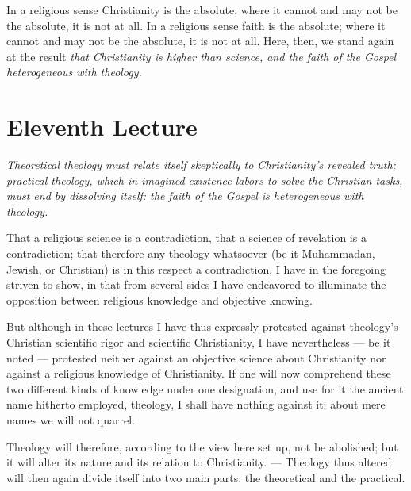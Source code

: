 \documentclass[12pt,a4paper]{book}
\begin{document}
In a religious sense Christianity is the absolute; where it cannot and may not be the absolute, it is
not at all. In a religious sense faith is the absolute; where it cannot and may not be the absolute,
it is not at all. Here, then, we stand again at the result
\emph{that Christianity is higher than science, and the faith of the Gospel heterogeneous with
theology.}

\chapter*{Eleventh Lecture}
\label{ch:forel11}

\begin{center}\itshape
Theoretical theology must relate itself skeptically to Christianity's
revealed truth; practical theology, which in imagined existence labors to
solve the Christian tasks, must end by dissolving itself: the faith of the
Gospel is heterogeneous with theology.
\end{center}

That a religious science is a contradiction, that a science of revelation is a contradiction; that
therefore any theology whatsoever (be it Muhammadan, Jewish, or Christian) is in this respect a
contradiction, I have in the foregoing striven to show, in that from several sides I have endeavored
to illuminate the opposition between religious knowledge and objective knowing.

But although in these lectures I have thus expressly protested against theology's Christian
scientific rigor and scientific Christianity, I have nevertheless --- be it noted --- protested
neither against an objective science about Christianity nor against a religious knowledge of
Christianity. If one will now comprehend these two different kinds of knowledge under one
designation, and use for it the ancient name hitherto employed, theology, I shall have nothing
against it: about mere names we will not quarrel.

Theology will therefore, according to the view here set up, not be abolished; but it will alter its
nature and its
relation to Christianity. --- Theology thus altered will then again divide itself into two main
parts: the theoretical and the practical.
\end{document}
